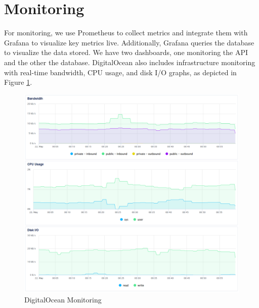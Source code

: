\documentclass[12pt, a4paper, oneside]{book}
\begin{document}
\section{Monitoring}
For monitoring, we use Prometheus to collect metrics and integrate them with Grafana to visualize key metrics live. Additionally, Grafana queries the database to visualize the data stored.
We have two dashboards, one monitoring the API and the other the database.
DigitalOcean also includes infrastructure monitoring with real-time bandwidth, CPU usage, and disk I/O graphs, as depicted in Figure \ref{fig:do-monitoring}.

\begin{figure}[H]
    \centering
    \includegraphics[width=0.7\linewidth]{images/do-monitoring.png}
    \caption{DigitalOcean Monitoring}
    \label{fig:do-monitoring}
\end{figure}
\end{document}
